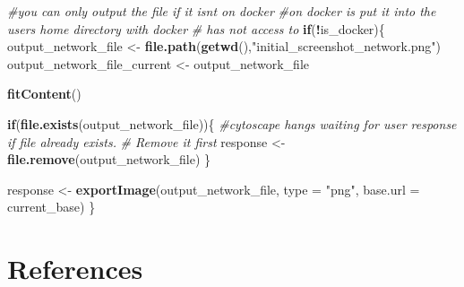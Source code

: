 \documentclass[
]{book}
\newenvironment{Shaded}{\begin{snugshade}}{\end{snugshade}}
\newcommand{\AttributeTok}[1]{\textcolor[rgb]{0.13,0.29,0.53}{#1}}
\newcommand{\CommentTok}[1]{\textcolor[rgb]{0.56,0.35,0.01}{\textit{#1}}}
\newcommand{\ControlFlowTok}[1]{\textcolor[rgb]{0.13,0.29,0.53}{\textbf{#1}}}
\newcommand{\FunctionTok}[1]{\textcolor[rgb]{0.13,0.29,0.53}{\textbf{#1}}}
\newcommand{\NormalTok}[1]{#1}
\newcommand{\OtherTok}[1]{\textcolor[rgb]{0.56,0.35,0.01}{#1}}
\newcommand{\SpecialCharTok}[1]{\textcolor[rgb]{0.81,0.36,0.00}{\textbf{#1}}}
\newcommand{\StringTok}[1]{\textcolor[rgb]{0.31,0.60,0.02}{#1}}
\begin{document}
\begin{Shaded}
\begin{Highlighting}[]
\CommentTok{\#you can only output the file if it isn\textquotesingle{}t on docker}
\CommentTok{\#on docker is put it into the user\textquotesingle{}s home directory with docker }
\CommentTok{\# has not access to}
\ControlFlowTok{if}\NormalTok{(}\SpecialCharTok{!}\NormalTok{is\_docker)\{}
\NormalTok{  output\_network\_file }\OtherTok{\textless{}{-}} \FunctionTok{file.path}\NormalTok{(}\FunctionTok{getwd}\NormalTok{(),}\StringTok{"initial\_screenshot\_network.png"}\NormalTok{)}
\NormalTok{  output\_network\_file\_current }\OtherTok{\textless{}{-}}\NormalTok{ output\_network\_file}

  \FunctionTok{fitContent}\NormalTok{()}

  \ControlFlowTok{if}\NormalTok{(}\FunctionTok{file.exists}\NormalTok{(output\_network\_file))\{}
    \CommentTok{\#cytoscape hangs waiting for user response if file already exists.}
    \CommentTok{\# Remove it first}
\NormalTok{    response }\OtherTok{\textless{}{-}} \FunctionTok{file.remove}\NormalTok{(output\_network\_file)}
\NormalTok{  \} }

\NormalTok{  response }\OtherTok{\textless{}{-}} \FunctionTok{exportImage}\NormalTok{(output\_network\_file, }\AttributeTok{type =} \StringTok{"png"}\NormalTok{,}
                          \AttributeTok{base.url =}\NormalTok{ current\_base)}
\NormalTok{\}}
\end{Highlighting}
\end{Shaded}

\chapter{References}\label{references}
\end{document}
